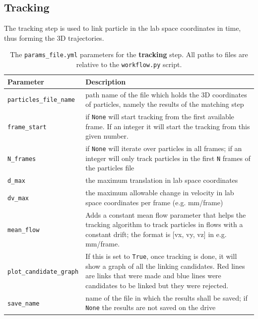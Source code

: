 \documentclass[10pt,a4paper]{article}
\begin{document}
\subsection{Tracking}\label{sec:workflow_track}

The tracking step is used to link particle in the lab space coordinates in time, thus forming the 3D trajectories.




\begin{table}[!ht]
	\centering
	\caption{The \texttt{params\_file.yml} parameters for the \textbf{tracking} step. All paths to files are relative to the \texttt{workflow.py} script.}
	\begin{tabular}{l m{10cm}}
		\hline
		Parameter & Description\\
		\hline
		
		\texttt{particles\_file\_name} & path name of the file which holds the 3D coordinates of particles, namely the results of the matching step  \\[.2cm]
		
		\texttt{frame\_start} & if \texttt{None} will start tracking from the first available frame. If an integer it will start the tracking from this given number. \\[.2cm]
		
		\texttt{N\_frames} & if \texttt{None} will iterate over particles in all frames; if an integer will only track particles in the first \texttt{N} frames of the particles file\\[.2cm]
		
		\texttt{d\_max} & the maximum translation in lab space coordinates \\[.2cm]
		
		\texttt{dv\_max} & the maximum allowable change in velocity in lab space coordinates per frame (e.g. mm/frame) \\[.2cm]
		
		\texttt{mean\_flow} & Adds a constant mean flow parameter that
		helps the tracking algorithm to track particles in flows with a constant drift; the format is [vx, vy, vz] in e.g. mm/frame. \\[.2cm]
		
		\texttt{plot\_candidate\_graph} & If this is set to \verb|True|, once tracking is done, it will show a graph of all the linking candidates. Red lines are links that were made and blue lines were candidates to be linked but they were rejected. \\[.2cm]
		
		
		\texttt{save\_name} & name of the file in which the results shall be saved; if \texttt{None} the results are not saved on the drive\\
		
		\hline
	\end{tabular}
\end{table}
\end{document}
